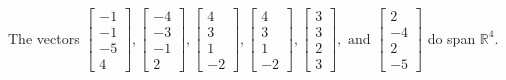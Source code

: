 \begin{exercise}
\begin{exerciseStatement}
  \end{exerciseStatement}
  \begin{exerciseAnswer}
   The vectors \(\left[\begin{array}{r}
-1 \\
-1 \\
-5 \\
4
\end{array}\right] , \left[\begin{array}{r}
-4 \\
-3 \\
-1 \\
2
\end{array}\right] , \left[\begin{array}{r}
4 \\
3 \\
1 \\
-2
\end{array}\right] , \left[\begin{array}{r}
4 \\
3 \\
1 \\
-2
\end{array}\right] , \left[\begin{array}{r}
3 \\
3 \\
2 \\
3
\end{array}\right] , \text{ and } \left[\begin{array}{r}
2 \\
-4 \\
2 \\
-5
\end{array}\right]\) 
  	 do  
	span \(\mathbb{R}^4\).
  


  \end{exerciseAnswer}
\end{exercise}